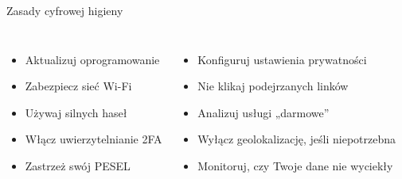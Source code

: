 \begin{frame}{Zasady cyfrowej higieny}
\begin{columns}[c]
    \begin{itemize}
        \item Aktualizuj oprogramowanie
        \item Zabezpiecz sieć Wi-Fi
        \item Używaj silnych haseł
        \item Włącz uwierzytelnianie 2FA
        \item Zastrzeż swój PESEL
    \end{itemize}
    \begin{itemize}
        \item Konfiguruj ustawienia prywatności
        \item Nie klikaj podejrzanych linków
        \item Analizuj usługi „darmowe”
        \item Wyłącz geolokalizację, jeśli niepotrzebna \cite{PROTECTION}
        \item Monitoruj, czy Twoje dane nie wyciekły
    \end{itemize}
\end{columns}
\end{frame}